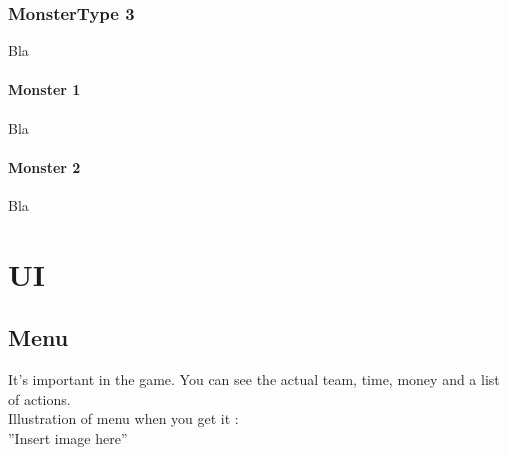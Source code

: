 \documentclass[a4paper,12pt]{book}
\begin{document}
\subsection{MonsterType 3}
Bla
\subsubsection{Monster 1}
Bla
\subsubsection{Monster 2}
Bla
\chapter{UI}
\section{Menu}
It's important in the game. You can see the actual team, time, money and a list of actions. \\ Illustration of menu when you get it : \\ ''Insert image here''
\end{document}
